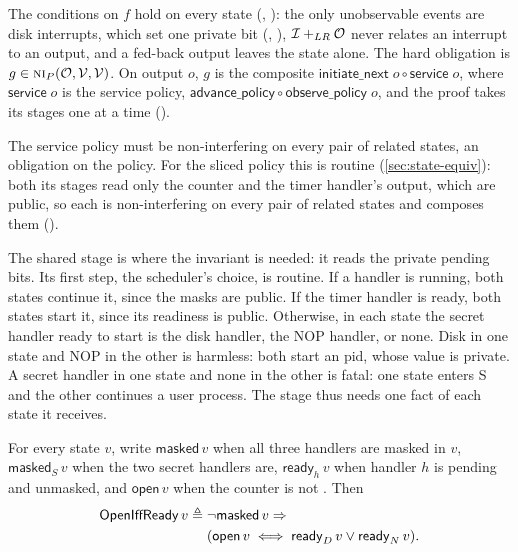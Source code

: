 The conditions on $f$ hold on every state (,
): the only unobservable events are disk interrupts, which set one
private bit (, ), $\mathcal{I} +_{LR} \mathcal{O}$ never relates an interrupt to an
output, and a fed-back output leaves the state alone. The hard obligation is
$g \in \text{\normalfont\scshape ni}_P(\mathcal{O},\mathcal{V},\mathcal{V})$. On output $o$, $g$ is the
composite $\mathsf{initiate\_next}\;o \circ \mathsf{service}\;o$, where
$\mathsf{service}\;o$ is the service policy,
$\mathsf{advance\_policy} \circ \mathsf{observe\_policy}\;o$, and the
proof takes its stages one at a time ().

The service policy must be non-interfering on every pair of related states, an
obligation on the policy. For the sliced policy this is routine
(\cref{sec:state-equiv}): both its stages read only the counter and the timer
handler's output, which are public, so each is non-interfering on every pair of
related states and  composes them ().

The shared stage  is where the invariant is needed: it reads the
private pending bits. Its first step, the scheduler's choice, is routine. If a handler
is running, both states continue it, since the masks are public. If the timer handler
is ready, both states start it, since its readiness is public. Otherwise, in each
state the secret handler ready to start is the disk handler, the NOP handler, or none.
Disk in one state and NOP in the other is harmless: both start an  pid,
whose value is private. A secret handler in one state and none in the other is fatal:
one state enters S and the other continues a user process. The stage thus needs one
fact of each state it receives.

\begin{definition}\label{def:ready}
For every state $v$, write $\mathsf{masked}\,v$ when all three handlers are masked in
$v$, $\mathsf{masked}_S\,v$ when the two secret handlers are, $\mathsf{ready}_h\,v$
when handler $h$ is pending and unmasked, and $\mathsf{open}\,v$ when the counter is
not . Then
\begin{align*}
\mathsf{OpenIffReady}\,v \triangleq{}& \neg\mathsf{masked}\,v \Rightarrow \\
&(\mathsf{open}\,v \iff \mathsf{ready}_D\,v \vee \mathsf{ready}_N\,v).
\end{align*}
\end{definition}

